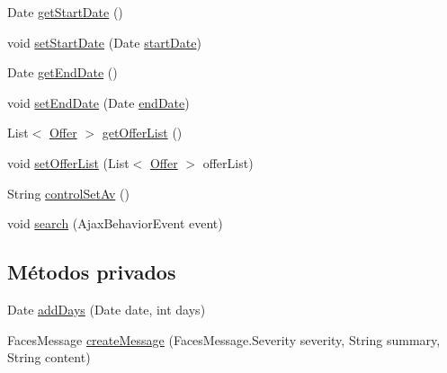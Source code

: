 \begin{DoxyCompactItemize}
\item 
Date \mbox{\hyperlink{classcom_1_1ruralhousejsf_1_1model_1_1availability_1_1_query_availability_bean_ae46fcaad171bc9a64b2ab26dba2118ef}{get\+Start\+Date}} ()
\item 
void \mbox{\hyperlink{classcom_1_1ruralhousejsf_1_1model_1_1availability_1_1_query_availability_bean_aeab72b6097d8b3c356a4d2353da24eb0}{set\+Start\+Date}} (Date \mbox{\hyperlink{classcom_1_1ruralhousejsf_1_1model_1_1availability_1_1_query_availability_bean_a1652bdd9864dc46b9c0fb5e31282032d}{start\+Date}})
\item 
Date \mbox{\hyperlink{classcom_1_1ruralhousejsf_1_1model_1_1availability_1_1_query_availability_bean_ad88c5dd8af5a7bfd0cccd39b0ce380df}{get\+End\+Date}} ()
\item 
void \mbox{\hyperlink{classcom_1_1ruralhousejsf_1_1model_1_1availability_1_1_query_availability_bean_a3610ce95ad8c1adad2e4405557953d40}{set\+End\+Date}} (Date \mbox{\hyperlink{classcom_1_1ruralhousejsf_1_1model_1_1availability_1_1_query_availability_bean_ab8a7c45b5539243a1d4f82bc5ae24305}{end\+Date}})
\item 
List$<$ \mbox{\hyperlink{classcom_1_1ruralhousejsf_1_1domain_1_1_offer}{Offer}} $>$ \mbox{\hyperlink{classcom_1_1ruralhousejsf_1_1model_1_1availability_1_1_query_availability_bean_ad9667676a26fe3df951a287607f14581}{get\+Offer\+List}} ()
\item 
void \mbox{\hyperlink{classcom_1_1ruralhousejsf_1_1model_1_1availability_1_1_query_availability_bean_a0a1948b5e5b3b7c6028a61d194429b0d}{set\+Offer\+List}} (List$<$ \mbox{\hyperlink{classcom_1_1ruralhousejsf_1_1domain_1_1_offer}{Offer}} $>$ offer\+List)
\item 
String \mbox{\hyperlink{classcom_1_1ruralhousejsf_1_1model_1_1availability_1_1_query_availability_bean_a1a498adf03c6caab6eb80a2da7483b50}{control\+Set\+Av}} ()
\item 
void \mbox{\hyperlink{classcom_1_1ruralhousejsf_1_1model_1_1availability_1_1_query_availability_bean_af7649b8dfb405d8faf95e00125b3efc3}{search}} (Ajax\+Behavior\+Event event)
\end{DoxyCompactItemize}
\subsection*{Métodos privados}
\begin{DoxyCompactItemize}
\item 
Date \mbox{\hyperlink{classcom_1_1ruralhousejsf_1_1model_1_1availability_1_1_query_availability_bean_a12d19b646905551923788bedc60f1ff7}{add\+Days}} (Date date, int days)
\item 
Faces\+Message \mbox{\hyperlink{classcom_1_1ruralhousejsf_1_1model_1_1availability_1_1_query_availability_bean_a0f1bb887ac4c3b90551c76fb51ba9253}{create\+Message}} (Faces\+Message.\+Severity severity, String summary, String content)
\end{DoxyCompactItemize}
